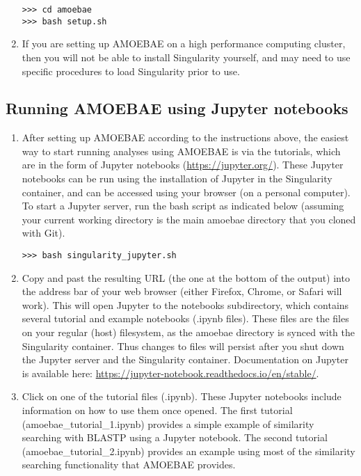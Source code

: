 \documentclass[12pt,letterpaper]{article}
\begin{document}
\begin{linenumbers}
\begin{enumerate}
\begin{lstlisting}
>>> cd amoebae
>>> bash setup.sh
\end{lstlisting}


\item If you are setting up AMOEBAE on a high performance computing cluster,
    then you will not be able to install Singularity yourself, and may need to
        use specific procedures to load Singularity prior to use.


\end{enumerate}

\subsection{Running AMOEBAE using Jupyter notebooks}
\label{jupyter_section}


\begin{enumerate}

\item After setting up AMOEBAE according to the instructions above, the easiest
    way to start running analyses using AMOEBAE is via the tutorials, which are in the
        form of Jupyter notebooks (\url{https://jupyter.org/}).  These Jupyter
        notebooks can be run using the installation of Jupyter in the
        Singularity container, and can be accessed using your browser (on a
        personal computer). To start a Jupyter server, run the bash script as
        indicated below (assuming your current working directory is the main
        amoebae directory that you cloned with Git).

\begin{lstlisting}
>>> bash singularity_jupyter.sh
\end{lstlisting}


\item Copy and past the resulting URL (the one at the bottom of the output)
    into the address bar of your web browser (either Firefox, Chrome, or Safari
    will work). This will open Jupyter to the notebooks subdirectory, which
        contains several tutorial and example notebooks (.ipynb files). These
        files are the files on your regular (host) filesystem, as the amoebae
        directory is synced with the Singularity container. Thus changes to
        files will persist after you shut down the Jupyter server and the
        Singularity container. Documentation on Jupyter is available here:
    \url{https://jupyter-notebook.readthedocs.io/en/stable/}. 


\item Click on one of the tutorial files (.ipynb). These Jupyter notebooks
    include information on how to use them once opened. The first tutorial
        (amoebae\_tutorial\_1.ipynb) provides a simple example of similarity
        searching with BLASTP using a Jupyter notebook. The second tutorial
        (amoebae\_tutorial\_2.ipynb) provides an example using most of the
        similarity searching functionality that AMOEBAE provides. 


\end{enumerate}
\end{linenumbers}
\end{document}
